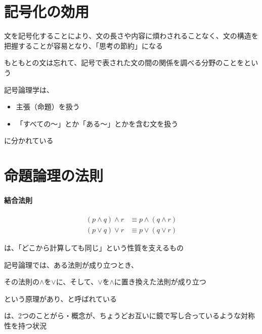 \documentclass[../book_ronri-and-set]{subfiles}
\begin{document}
\section{記号化の効用}

文を記号化することにより、文の長さや内容に煩わされることなく、文の構造を把握することが容易となり、「思考の節約」になる

\br

もともとの文は忘れて、記号で表された文の間の関係を調べる分野のことをという

\br

記号論理学は、
\begin{itemize}
  \item 主張（命題）を扱う
  \item 「すべての〜」とか「ある〜」とかを含む文を扱う
\end{itemize}
に分かれている

\sectionline
\section{命題論理の法則}

\begin{oframed}
  \paragraph{結合法則}
  \begin{align*}
    (p \land q) \land r & \equiv p \land (q \land r) \\
    (p \lor q) \lor r   & \equiv p \lor (q \lor r)
  \end{align*}
\end{oframed}

は、「どこから計算しても同じ」という性質を支えるもの

\sectionline

記号論理では、ある法則が成り立つとき、
\begin{shaded*}
  その法則の$\land$を$\lor$に、そして、$\lor$を$\land$に置き換えた法則が成り立つ
\end{shaded*}
という原理があり、と呼ばれている

\br

\begin{shaded*}
  は、2つのことがら・概念が、ちょうどお互いに鏡で写し合っているような対称性を持つ状況
\end{shaded*}
\end{document}
